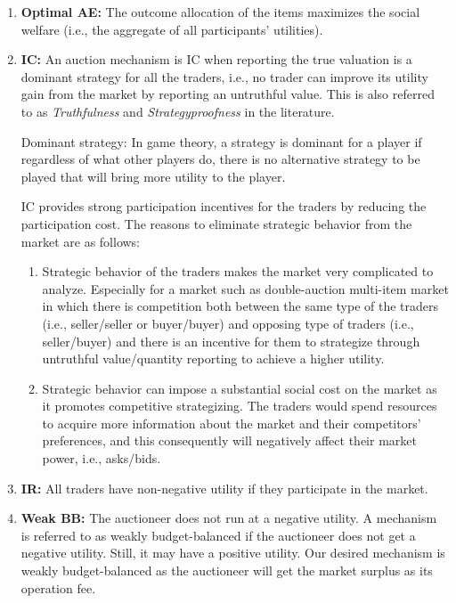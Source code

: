 \begin{enumerate}
\item \textbf{Optimal \acf{AE}:} The outcome allocation of the items maximizes the social welfare (i.e., the aggregate of all participants' utilities).
\item \textbf{\acf{IC}:} An auction mechanism is IC when reporting the true valuation is a dominant strategy for all the traders, i.e., no trader can improve its utility gain from the market by reporting an untruthful value. This is also referred to as \textit{Truthfulness} and \textit{Strategyproofness} in the literature.
\begin{Definition}
Dominant strategy: In game theory, a strategy is dominant for a player if regardless of what other players do, there is no alternative strategy to be played that will bring more utility to the player.
\end{Definition}
IC provides strong participation incentives for the traders by reducing the participation cost. The reasons to eliminate strategic behavior from the market are as follows:
\begin{enumerate}
\item Strategic behavior of the traders makes the market very complicated to analyze. Especially for a market such as double-auction multi-item market in which there is competition both between the same type of the traders (i.e., seller/seller or buyer/buyer) and opposing type of traders (i.e., seller/buyer) and there is an incentive for them to strategize through untruthful value/quantity reporting to achieve a higher utility.

\item Strategic behavior can impose a substantial social cost on the market as it promotes competitive strategizing. The traders would spend resources to acquire more information about the market and their competitors' preferences, and this consequently will negatively affect their market power, i.e., asks/bids.
\end{enumerate}
\item \textbf{\acf{IR}:} All traders have non-negative utility if they participate in the market.
\item \textbf{Weak \acf{BB}:} The auctioneer does not run at a negative utility. A mechanism is referred to as weakly budget-balanced if the auctioneer does not get a negative utility. Still, it may have a positive utility.  %
Our desired mechanism is weakly budget-balanced as the auctioneer will get the market surplus as its operation fee.
\end{enumerate}
